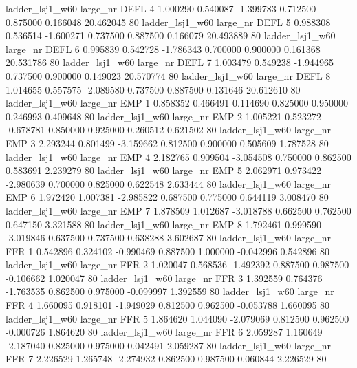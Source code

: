     ladder_lsj1_w60   large_nr     DEFL                 4  1.000290  0.540087  -1.399783 0.712500 0.875000  0.166048   20.462045 80
    ladder_lsj1_w60   large_nr     DEFL                 5  0.988308  0.536514  -1.600271 0.737500 0.887500  0.166079   20.493889 80
    ladder_lsj1_w60   large_nr     DEFL                 6  0.995839  0.542728  -1.786343 0.700000 0.900000  0.161368   20.531786 80
    ladder_lsj1_w60   large_nr     DEFL                 7  1.003479  0.549238  -1.944965 0.737500 0.900000  0.149023   20.570774 80
    ladder_lsj1_w60   large_nr     DEFL                 8  1.014655  0.557575  -2.089580 0.737500 0.887500  0.131646   20.612610 80
    ladder_lsj1_w60   large_nr      EMP                 1  0.858352  0.466491   0.114690 0.825000 0.950000  0.246993    0.409648 80
    ladder_lsj1_w60   large_nr      EMP                 2  1.005221  0.523272  -0.678781 0.850000 0.925000  0.260512    0.621502 80
    ladder_lsj1_w60   large_nr      EMP                 3  2.293244  0.801499  -3.159662 0.812500 0.900000  0.505609    1.787528 80
    ladder_lsj1_w60   large_nr      EMP                 4  2.182765  0.909504  -3.054508 0.750000 0.862500  0.583691    2.239279 80
    ladder_lsj1_w60   large_nr      EMP                 5  2.062971  0.973422  -2.980639 0.700000 0.825000  0.622548    2.633444 80
    ladder_lsj1_w60   large_nr      EMP                 6  1.972420  1.007381  -2.985822 0.687500 0.775000  0.644119    3.008470 80
    ladder_lsj1_w60   large_nr      EMP                 7  1.878509  1.012687  -3.018788 0.662500 0.762500  0.647150    3.321588 80
    ladder_lsj1_w60   large_nr      EMP                 8  1.792461  0.999590  -3.019846 0.637500 0.737500  0.638288    3.602687 80
    ladder_lsj1_w60   large_nr      FFR                 1  0.542896  0.324102  -0.990469 0.887500 1.000000 -0.042996    0.542896 80
    ladder_lsj1_w60   large_nr      FFR                 2  1.020047  0.568536  -1.492392 0.887500 0.987500 -0.106662    1.020047 80
    ladder_lsj1_w60   large_nr      FFR                 3  1.392559  0.764376  -1.763535 0.862500 0.975000 -0.099997    1.392559 80
    ladder_lsj1_w60   large_nr      FFR                 4  1.660095  0.918101  -1.949029 0.812500 0.962500 -0.053788    1.660095 80
    ladder_lsj1_w60   large_nr      FFR                 5  1.864620  1.044090  -2.079069 0.812500 0.962500 -0.000726    1.864620 80
    ladder_lsj1_w60   large_nr      FFR                 6  2.059287  1.160649  -2.187040 0.825000 0.975000  0.042491    2.059287 80
    ladder_lsj1_w60   large_nr      FFR                 7  2.226529  1.265748  -2.274932 0.862500 0.987500  0.060844    2.226529 80
